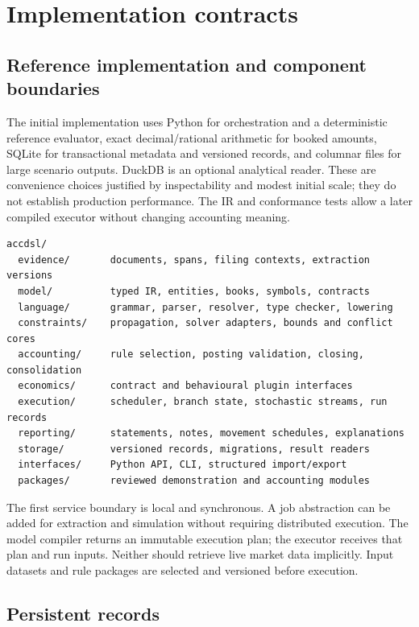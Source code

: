 \chapter{Implementation contracts}
\label{ch:implementation}

\section{Reference implementation and component boundaries}

The initial implementation uses Python for orchestration and a deterministic
reference evaluator, exact decimal/rational arithmetic for booked amounts,
SQLite for transactional metadata and versioned records, and columnar files
for large scenario outputs. DuckDB is an optional analytical reader. These
are convenience choices justified by inspectability and modest initial scale;
they do not establish production performance. The IR and conformance tests
allow a later compiled executor without changing accounting meaning.

\begin{lstlisting}
accdsl/
  evidence/       documents, spans, filing contexts, extraction versions
  model/          typed IR, entities, books, symbols, contracts
  language/       grammar, parser, resolver, type checker, lowering
  constraints/    propagation, solver adapters, bounds and conflict cores
  accounting/     rule selection, posting validation, closing, consolidation
  economics/      contract and behavioural plugin interfaces
  execution/      scheduler, branch state, stochastic streams, run records
  reporting/      statements, notes, movement schedules, explanations
  storage/        versioned records, migrations, result readers
  interfaces/     Python API, CLI, structured import/export
  packages/       reviewed demonstration and accounting modules
\end{lstlisting}

The first service boundary is local and synchronous. A job abstraction can be
added for extraction and simulation without requiring distributed execution.
The model compiler returns an immutable execution plan; the executor receives
that plan and run inputs. Neither should retrieve live market data implicitly.
Input datasets and rule packages are selected and versioned before execution.

\section{Persistent records}

